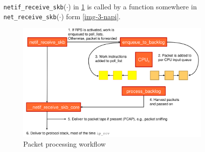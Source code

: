 \documentclass[english]{panikzettel}
\newcommand{\fkt}[1]{\texttt{#1}(\(\cdot\))}
\begin{document}
	\fkt{netif\_receive\_skb} in \cref{img-3-packet-processing-workflow} is called by a function somewhere in \fkt{net\_receive\_skb} form \cref{img-3-napi}.

	\begin{figure}[H]
		\centering
		\includegraphics[width=0.85\textwidth]{img/3-packet-processing-workflow.png}
		\caption{Packet processing workflow}
		\label{img-3-packet-processing-workflow}
	\end{figure}
	
		
	





	

	
				
\end{document}
